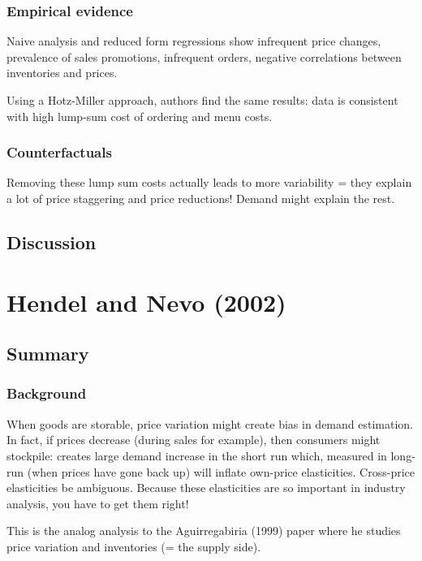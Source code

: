 \subsubsection{Empirical evidence}

Naive analysis and reduced form regressions show infrequent price changes, prevalence of sales promotions, infrequent orders, negative correlations between inventories and prices.

Using a Hotz-Miller approach, authors find the same results: data is consistent with high lump-sum cost of ordering and menu costs.

\subsubsection{Counterfactuals}

Removing these lump sum costs actually leads to more variability = they explain a lot of price staggering and price reductions! Demand might explain the rest.

\subsection{Discussion}



\section{Hendel and Nevo (2002)}

\subsection{Summary}

\subsubsection{Background}

When goods are storable, price variation might create bias in demand estimation. In fact, if prices decrease (during sales for example), then consumers might stockpile: creates large demand increase in the short run which, measured in long-run (when prices have gone back up) will inflate own-price elasticities. Cross-price elasticities be ambiguous. Because these elasticities are so important in industry analysis, you have to get them right!

This is the analog analysis to the Aguirregabiria (1999) paper where he studies price variation and inventories (= the supply side).

